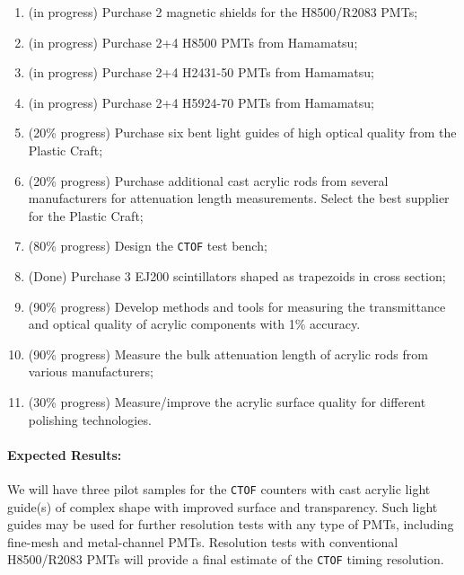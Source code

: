 \documentclass[12pt]{article}
\begin{document}
\begin{enumerate}
  \item (in progress) Purchase 2 magnetic shields for the H8500/R2083 PMTs;
  \item (in progress) Purchase 2+4 H8500 PMTs from Hamamatsu;
  \item (in progress) Purchase 2+4 H2431-50 PMTs from Hamamatsu;
  \item (in progress) Purchase 2+4 H5924-70 PMTs from Hamamatsu;
  \item (20\% progress) Purchase six bent light guides of high optical 
        quality from the Plastic Craft;
  \item (20\% progress) Purchase additional cast acrylic rods from several 
        manufacturers for attenuation length measurements. Select the best 
        supplier for the Plastic Craft; 
  \item (80\% progress) Design the {\tt CTOF} test bench;
  \item (Done) Purchase 3 EJ200 scintillators shaped as trapezoids in cross 
        section;
  \item (90\% progress) Develop methods and tools for measuring the  
        transmittance and optical quality of acrylic components with 1\% 
        accuracy.
  \item (90\% progress) Measure the bulk attenuation length of acrylic rods 
        from various manufacturers;
  \item (30\% progress) Measure/improve the acrylic surface quality for 
        different polishing technologies.
\end{enumerate}

\paragraph{Expected Results:} 
We will have three pilot samples for the {\tt CTOF} counters with cast acrylic 
light guide(s) of complex shape with improved surface and transparency. 
Such light guides may be used for further resolution tests with any type of 
PMTs, including fine-mesh and metal-channel PMTs.  Resolution tests with 
conventional H8500/R2083 PMTs will provide a final estimate of the 
{\tt CTOF} timing resolution.
\end{document}
